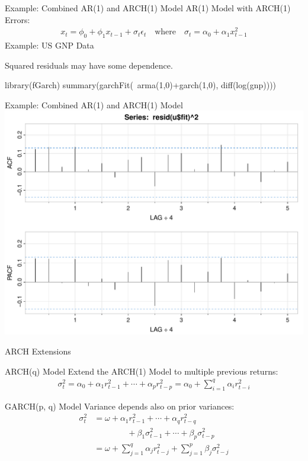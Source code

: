 \documentclass[ignorenonframetext,xcolor=x11names]{beamer}
\begin{document}
\begin{frame}[fragile]{Example: Combined AR(1) and ARCH(1) Model}
AR(1) Model with ARCH(1) Errors:
\begin{align*}
x_t = \phi_0 + \phi_1 x_{t-1} + \sigma_t \epsilon_t \quad \text{where} \quad \sigma_t = \alpha_0 + \alpha_1 x_{t-1}^2
\end{align*} 
Example: US GNP Data
Squared residuals may have some dependence.
\begin{Rcode}
library(fGarch)
summary(garchFit(~arma(1,0)+garch(1,0), diff(log(gnp))))
\end{Rcode}
\end{frame}

\begin{frame}{Example: Combined AR(1) and ARCH(1) Model}
\centering
\includegraphics[width=\textwidth]{figure35.pdf}
\end{frame}

\begin{frame}{ARCH Extensions}
\begin{block}{ARCH(q) Model}
Extend the ARCH(1) Model to multiple previous returns:
\begin{align*}
\sigma_t^2 = \alpha_0 + \alpha_1 r_{t-1}^2 + \cdots + \alpha_p r_{t-p}^2 = \alpha_0 + \sum_{i=1}^q \alpha_i r_{t-i}^2
\end{align*}
\end{block}

\begin{block}{GARCH(p, q) Model}
Variance depends also on prior variances:
\begin{align*}
\sigma_t^2 &= \omega + \alpha_1 r_{t-1}^2 + \cdots + \alpha_q r_{t-q}^2 \\
           & \qquad \qquad + \beta_1 \sigma_{t-1}^2 + \cdots + \beta_p \sigma_{t-p}^2 \\
           &= \omega + \sum_{j=1}^q \alpha_j r_{t-j}^2 + \sum_{j=1}^p \beta_j \sigma_{t-j}^2
\end{align*}
\end{block}
\end{frame}
\end{document}
